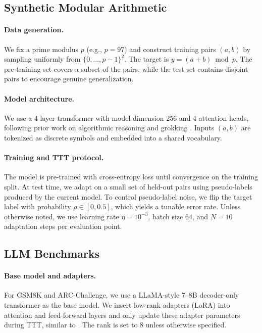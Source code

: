 \documentclass{article}
\theoremstyle{plain}
\theoremstyle{definition}
\theoremstyle{remark}
\begin{document}
\subsection{Synthetic Modular Arithmetic}

\paragraph{Data generation.}
We fix a prime modulus $p$ (e.g., $p=97$) and construct training pairs $(a,b)$ by sampling uniformly from $\{0,\dots,p-1\}^2$. The target is $y = (a+b) \bmod p$. The pre-training set covers a subset of the pairs, while the test set contains disjoint pairs to encourage genuine generalization.

\paragraph{Model architecture.}
We use a 4-layer transformer with model dimension 256 and 4 attention heads, following prior work on algorithmic reasoning and grokking \cite{power2022grokking,liu2024physics}. Inputs $(a,b)$ are tokenized as discrete symbols and embedded into a shared vocabulary.

\paragraph{Training and TTT protocol.}
The model is pre-trained with cross-entropy loss until convergence on the training split. At test time, we adapt on a small set of held-out pairs using pseudo-labels produced by the current model. To control pseudo-label noise, we flip the target label with probability $\rho \in [0,0.5]$, which yields a tunable error rate. Unless otherwise noted, we use learning rate $\eta=10^{-3}$, batch size 64, and $N=10$ adaptation steps per evaluation point.

\subsection{LLM Benchmarks}

\paragraph{Base model and adapters.}
For GSM8K and ARC-Challenge, we use a LLaMA-style 7--8B decoder-only transformer as the base model. We insert low-rank adapters (LoRA) into attention and feed-forward layers and only update these adapter parameters during TTT, similar to \cite{templora2024,tlm2025,inplacettt2025}. The rank is set to 8 unless otherwise specified.
\end{document}
